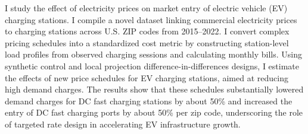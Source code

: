 I study the effect of electricity prices on market entry of electric vehicle (EV) charging stations. I compile a novel dataset linking commercial electricity prices to charging stations across U.S. ZIP codes from 2015–2022. I convert complex pricing schedules into a standardized cost metric by constructing station-level load profiles from observed charging sessions and calculating monthly bills. Using synthetic control and local projection difference-in-differences designs, I estimate the effects of new price schedules for EV charging stations, aimed at reducing high demand charges.
The results show that these schedules substantially lowered demand charges for DC fast charging stations by about 50\% and increased the entry of DC fast charging ports by about 50\% per zip code, underscoring the role of targeted rate design in accelerating EV infrastructure growth.



